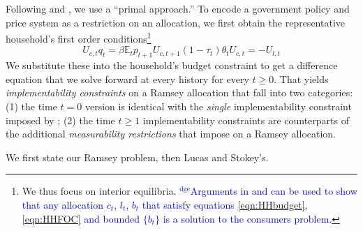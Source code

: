 \documentclass[12pt]{article}
\newcommand{\dge}[1]{\textcolor{blue}{$^{\textrm{dge}}${#1}}}
\newcommand{\EE}{\mathbb E}
\begin{document}
Following \citet{LucasJr.1983}
and
\citet{Aiyagari2002}, we use a
``primal approach.''   To encode a  government policy and price system as a restriction on an allocation,
we  first obtain   the representative household's first order conditions\footnote{We thus focus on interior equilibria. \dge{Arguments in \cite{Magill1994} and \cite{Constantinides1996} can be used to show that any allocation $c_t$, $l_t$, $b_t$ that satisfy equations \eqref{eqn:HHbudget},\eqref{eqn:HHFOC} and bounded $\{b_t\}$ is a solution to the consumers problem.} }
\begin{subequations}\label{eqn:HHFOC}
	\begin{equation}
	\label{eqn:Euler}
		U_{c,t} q_t = \beta \EE_t p_{t+1}U_{c,t+1} 
	\end{equation}
	\begin{equation}\label{eqn:lcFOC}
		(1-\tau_t)\theta_tU_{c,t} = - U_{l,t} 
	\end{equation}


\end{subequations}
We substitute these into the household's budget constraint to get a difference equation that we  solve forward   at every history for every $t \geq 0$.
That yields \textit{implementability constraints} on a Ramsey allocation that fall into two categories: (1) the time $t=0$ version is identical
with the {\em single} implementability constraint imposed by \citet{LucasJr.1983}; (2) the time $t \geq 1$ implementability constraints
are counterparts  of the additional
 \emph{measurability restrictions} that \citet{Aiyagari2002} impose on  a Ramsey allocation.
%





%
%
%
%
%
We first state our Ramsey problem, then Lucas and Stokey's.
\end{document}
